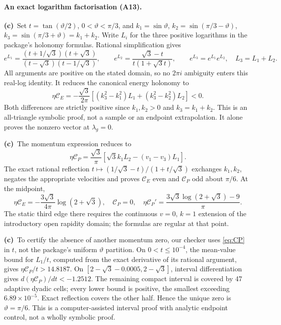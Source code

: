 \documentclass[11pt,a4paper]{article}
\newcommand{\Lc}{\textbf{(c)}\ }
\begin{document}
\paragraph{An exact logarithm factorisation (A13).}
\Lc Set $t=\tan(\vartheta/2)$, $0<\vartheta<\pi/3$, and
$k_1=\sin\vartheta$, $k_2=\sin(\pi/3-\vartheta)$,
$k_3=\sin(\pi/3+\vartheta)=k_1+k_2$. Write $L_i$ for the three positive
logarithms in the package's holonomy formulas. Rational simplification gives
\begin{equation}
 e^{L_1}=\frac{(t+1/\sqrt3)(t+\sqrt3)}{(t-\sqrt3)(t-1/\sqrt3)},\qquad
 e^{L_2}=\frac{\sqrt3-t}{t(1+\sqrt3t)},\qquad
 \boxed{e^{L_3}=e^{L_1}e^{L_2},\quad L_3=L_1+L_2.}
 \label{eq:logs}
\end{equation}
All arguments are positive on the stated domain, so no $2\pi i$ ambiguity
enters this real-log identity. It reduces the canonical energy holonomy to
\begin{equation}
 \boxed{\quad
 \eta\mathcal C_E=-\frac{\sqrt3}{2\pi}
 [(k_3^2-k_1^2)L_1+(k_3^2-k_2^2)L_2]<0.
 \quad} \label{eq:strictenergy}
\end{equation}
Both differences are strictly positive since $k_1,k_2>0$ and
$k_3=k_1+k_2$. This is an all-triangle symbolic proof, not a sample or an
endpoint extrapolation. It alone proves the nonzero vector at $\lambda_g=0$.

\Lc The momentum expression reduces to
\begin{equation}
 \eta\mathcal C_P=\frac{\sqrt3}{\pi}
 [\sqrt3k_1L_2-(v_1-v_3)L_1]. \label{eq:CP}
\end{equation}
The exact rational reflection
$t\mapsto(1/\sqrt3-t)/(1+t/\sqrt3)$ exchanges $k_1,k_2$, negates the
appropriate velocities and proves $\mathcal C_E$ even and $\mathcal C_P$
odd about $\pi/6$. At the midpoint,
\begin{equation}
 \eta\mathcal C_E=-\frac{3\sqrt3}{4\pi}\log(2+\sqrt3),\quad
 \mathcal C_P=0,\quad
 \eta\mathcal C_P'=\frac{3\sqrt3\log(2+\sqrt3)-9}{\pi}.
\end{equation}
The static third edge there requires the continuous $v=0$, $k=1$
extension of the introductory open rapidity domain; the formulas are
regular at that point.

\Lc To certify the absence of another momentum zero, our checker uses
\eqref{eq:CP} in $t$, not the package's uniform $\vartheta$ partition.
On $0<t\le10^{-4}$, the mean-value bound for $L_1/t$, computed from the
exact derivative of its rational argument, gives
$\eta\mathcal C_P/t>14.8187$.
On $[2-\sqrt3-0.0005,2-\sqrt3]$, interval differentiation gives
$d(\eta\mathcal C_P)/dt<-1.2512$.
The remaining compact interval is covered by 47 adaptive dyadic cells;
every lower bound is positive, the smallest exceeding
$6.89\times10^{-5}$. Exact reflection covers the other half. Hence the
unique zero is $\vartheta=\pi/6$. This is a computer-assisted interval
proof with analytic endpoint control, not a wholly symbolic proof.
\end{document}
